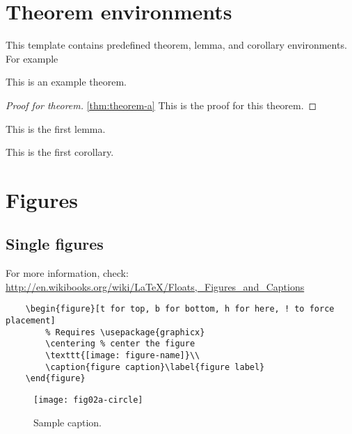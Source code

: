 \section{Theorem environments}
This template contains predefined theorem, lemma, and corollary environments. For example
\begin{theorem}\label{thm:theorem-a}
    This is an example theorem.
\end{theorem}
\begin{proof}[Proof for theorem] \ref{thm:theorem-a}
    This is the proof for this theorem.
\end{proof}
\begin{lemma}
    This is the first lemma.
\end{lemma}
\begin{corollary}
    This is the first corollary.
\end{corollary}

\newpage
\section{Figures}
\subsection{Single figures}
For more information, check: \href{http://en.wikibooks.org/wiki/LaTeX/Floats,_Figures_and_Captions}{http://en.wikibooks.org/wiki/LaTeX/Floats,\_Figures\_and\_Captions}
\begin{verbatim}
    \begin{figure}[t for top, b for bottom, h for here, ! to force placement]
        % Requires \usepackage{graphicx}
        \centering % center the figure
        \texttt{[image: figure-name]}\\
        \caption{figure caption}\label{figure label}
    \end{figure}
\end{verbatim}
\begin{figure}[h!]
  \centering
  \texttt{[image: fig02a-circle]}\\
  \caption{Sample caption.}\label{label}
\end{figure}
\newpage
